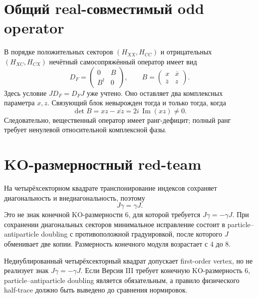 \section{Общий real-совместимый odd operator}

В порядке положительных секторов \((H_{XX},H_{CC})\) и отрицательных
\((H_{XC},H_{CX})\) нечётный самосопряжённый оператор имеет вид
\begin{equation}
 D_F=
 \begin{pmatrix}
 0&B\\
 B^\dagger&0
 \end{pmatrix},
 \qquad
 B=
 \begin{pmatrix}
 x&\overline x\\
 \overline z&z
 \end{pmatrix}.
\end{equation}
Здесь условие \(JD_F=D_FJ\) уже учтено. Оно оставляет два комплексных
параметра \(x,z\). Связующий блок невырожден тогда и только тогда, когда
\begin{equation}
 \det B=xz-\overline{xz}
 =2i\,\operatorname{Im}(xz)\ne0.
\end{equation}
Следовательно, вещественный оператор имеет ранг-дефицит; полный ранг требует
ненулевой относительной комплексной фазы.

\section{KO-размерностный red-team}

На четырёхсекторном квадрате транспонирование индексов сохраняет
диагональность и внедиагональность, поэтому
\begin{equation}
 J\gamma=\gamma J.
\end{equation}
Это не знак конечной KO-размерности \(6\), для которой требуется
\(J\gamma=-\gamma J\). При сохранении диагональных секторов минимальное
исправление состоит в particle--antiparticle doubling с противоположной
градуировкой, после которого \(J\) обменивает две копии. Размерность
конечного модуля возрастает с \(4\) до \(8\).

\begin{nogocriterion}[KO6 undoubled no-go]
Недиублированный четырёхсекторный квадрат допускает first-order vertex, но
не реализует знак \(J\gamma=-\gamma J\). Если Версия III требует конечную
KO-размерность \(6\), particle--antiparticle doubling является
обязательным, а правило физического half-trace должно быть выведено до
сравнения нормировок.
\end{nogocriterion}

